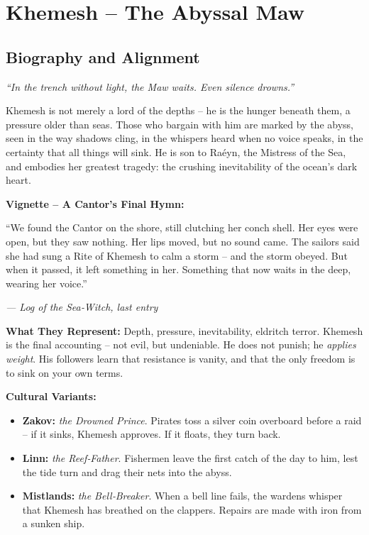 \documentclass[10pt,a5paper]{book}
\begin{document}
\section{Khemesh – The Abyssal Maw}
\label{patron:khemesh}

\subsection*{Biography and Alignment}

\textit{“In the trench without light, the Maw waits. Even silence drowns.”}

Khemesh is not merely a lord of the depths – he is the hunger beneath them, a pressure older than seas. Those who bargain with him are marked by the abyss, seen in the way shadows cling, in the whispers heard when no voice speaks, in the certainty that all things will sink. He is son to Raéyn, the Mistress of the Sea, and embodies her greatest tragedy: the crushing inevitability of the ocean’s dark heart.

\textbf{Vignette – A Cantor’s Final Hymn:}
\epigraph{“We found the Cantor on the shore, still clutching her conch shell. Her eyes were open, but they saw nothing. Her lips moved, but no sound came. The sailors said she had sung a Rite of Khemesh to calm a storm – and the storm obeyed. But when it passed, it left something in her. Something that now waits in the deep, wearing her voice.”}{\textit{— Log of the Sea‑Witch, last entry}}

\textbf{What They Represent:} Depth, pressure, inevitability, eldritch terror. Khemesh is the final accounting – not evil, but undeniable. He does not punish; he \textit{applies weight}. His followers learn that resistance is vanity, and that the only freedom is to sink on your own terms.

\textbf{Cultural Variants:}
\begin{itemize}
    \item \textbf{Zakov:} \textit{the Drowned Prince}. Pirates toss a silver coin overboard before a raid – if it sinks, Khemesh approves. If it floats, they turn back.
    \item \textbf{Linn:} \textit{the Reef‑Father}. Fishermen leave the first catch of the day to him, lest the tide turn and drag their nets into the abyss.
    \item \textbf{Mistlands:} \textit{the Bell‑Breaker}. When a bell line fails, the wardens whisper that Khemesh has breathed on the clappers. Repairs are made with iron from a sunken ship.
\end{itemize}
\end{document}
